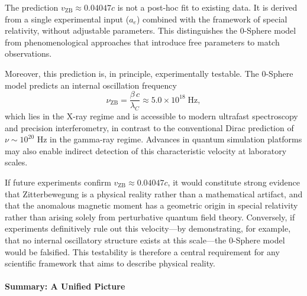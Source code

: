 \documentclass[12pt,letterpaper]{article}
\begin{document}
The prediction $v_{\mathrm{ZB}} \approx 0.04047c$ is not a post-hoc fit to existing data. It is derived from a single experimental input ($a_e$) combined with the framework of special relativity, without adjustable parameters. This distinguishes the 0-Sphere model from phenomenological approaches that introduce free parameters to match observations.

Moreover, this prediction is, in principle, experimentally testable. The 0-Sphere model predicts an internal oscillation frequency
\begin{equation}
  \nu_{\mathrm{ZB}} = \frac{\beta\,c}{\lambda_C} \approx 5.0 \times 10^{18}\;\text{Hz},
\end{equation}
which lies in the X-ray regime and is accessible to modern ultrafast spectroscopy and precision interferometry, in contrast to the conventional Dirac prediction of $\nu \sim 10^{20}$ Hz in the gamma-ray regime. Advances in quantum simulation platforms may also enable indirect detection of this characteristic velocity at laboratory scales.

If future experiments confirm $v_{\mathrm{ZB}} \approx 0.04047c$, it would constitute strong evidence that Zitterbewegung is a physical reality rather than a mathematical artifact, and that the anomalous magnetic moment has a geometric origin in special relativity rather than arising solely from perturbative quantum field theory. Conversely, if experiments definitively rule out this velocity---by demonstrating, for example, that no internal oscillatory structure exists at this scale---the 0-Sphere model would be falsified. This testability is therefore a central requirement for any scientific framework that aims to describe physical reality.

\paragraph{Summary: A Unified Picture}
\end{document}
